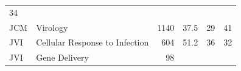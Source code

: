 \documentclass[11pt,]{article}
\begin{document}
\begin{longtable}[]{@{}llrrrr@{}}
\begin{minipage}[t]{0.11\columnwidth}
34\strut
\end{minipage}\tabularnewline
\begin{minipage}[t]{0.06\columnwidth}\raggedright\strut
JCM\strut
\end{minipage} & \begin{minipage}[t]{0.43\columnwidth}\raggedright\strut
Virology\strut
\end{minipage} & \begin{minipage}[t]{0.04\columnwidth}\raggedleft\strut
1140\strut
\end{minipage} & \begin{minipage}[t]{0.08\columnwidth}\raggedleft\strut
37.5\strut
\end{minipage} & \begin{minipage}[t]{0.11\columnwidth}\raggedleft\strut
29\strut
\end{minipage} & \begin{minipage}[t]{0.11\columnwidth}\raggedleft\strut
41\strut
\end{minipage}\tabularnewline
\begin{minipage}[t]{0.06\columnwidth}\raggedright\strut
JVI\strut
\end{minipage} & \begin{minipage}[t]{0.43\columnwidth}\raggedright\strut
Cellular Response to Infection\strut
\end{minipage} & \begin{minipage}[t]{0.04\columnwidth}\raggedleft\strut
604\strut
\end{minipage} & \begin{minipage}[t]{0.08\columnwidth}\raggedleft\strut
51.2\strut
\end{minipage} & \begin{minipage}[t]{0.11\columnwidth}\raggedleft\strut
36\strut
\end{minipage} & \begin{minipage}[t]{0.11\columnwidth}\raggedleft\strut
32\strut
\end{minipage}\tabularnewline
\begin{minipage}[t]{0.06\columnwidth}\raggedright\strut
JVI\strut
\end{minipage} & \begin{minipage}[t]{0.43\columnwidth}\raggedright\strut
Gene Delivery\strut
\end{minipage} & \begin{minipage}[t]{0.04\columnwidth}\raggedleft\strut
98\strut
\end{minipage} & \begin{minipage}[t]{0.08\columnwidth}\raggedleft\strut

\end{minipage}
\end{longtable}
\end{document}
